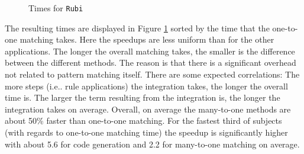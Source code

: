 \documentclass[conference,compsoc]{IEEEtran}
\makeatletter
\DeclareRobustCommand\onedot{\futurelet\@let@token\@onedot}
\def\@onedot{\ifx\@let@token.\else.\null\fi\xspace}
\def\ie{{i.e}\onedot} \def\Ie{{I.e}\onedot}
\makeatother
\begin{document}
\begin{figure}[h]
    \centering
    \caption{Times for \texttt{Rubi}}\label{fig:rubi-times}
\end{figure}

The resulting times are displayed in Figure \ref{fig:rubi-times} sorted by the time that the one-to-one matching takes.
Here the speedups are less uniform than for the other applications.
The longer the overall matching takes, the smaller is the difference between the different methods.
The reason is that there is a significant overhead not related to pattern matching itself.
There are some expected correlations: The more steps (\ie rule applications) the integration takes, the longer the overall time is. The larger the term resulting from the integration is, the longer the integration takes on average.
Overall, on average the many-to-one methods are about 50\% faster than one-to-one matching.
For the fastest third of subjects (with regards to one-to-one matching time) the speedup is significantly higher with about 5.6 for code generation and 2.2 for many-to-one matching on average.
\end{document}
